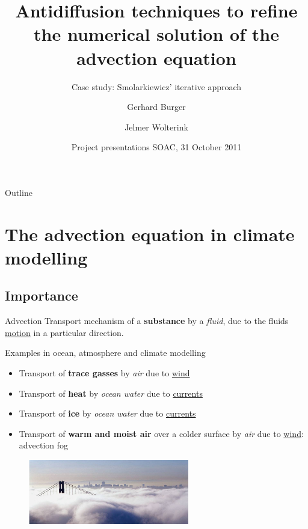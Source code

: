 \documentclass[hyperref={pdfstartview=Fit}]{beamer}
\title[Advection equation and antidiffusion]%
{Antidiffusion techniques to refine the numerical solution of the advection equation}
\subtitle{Case study: Smolarkiewicz' iterative approach}
\author[Burger, Wolterink]%
{Gerhard Burger \and Jelmer Wolterink}
\institute[Utrecht University]%
{
  Scientific Computing\\
  Department of Mathematics\\
  Utrecht University
}
\date[31-Oct-2011] %
{Project presentations SOAC, 31 October 2011}
\begin{document}
\begin{frame}
  \titlepage
\end{frame}

\begin{frame}{Outline}
  \tableofcontents
\end{frame}

\section{The advection equation in climate modelling}
\subsection{Importance}

\begin{frame}

\begin{block}{Advection}
Transport mechanism of a \textbf{substance} by a \textit{fluid}, due to the fluids \underline{motion} in a particular direction.
\end{block}

Examples in ocean, atmosphere and climate modelling

\begin{itemize}
   \item Transport of \textbf{trace gasses} by \textit{air} due to \underline{wind}
   \item Transport of \textbf{heat} by \textit{ocean water} due to \underline{currents}
   \item Transport of \textbf{ice} by \textit{ocean water} due to \underline{currents}
   \item Transport of \textbf{warm and moist air} over a colder surface by \textit{air} due to \underline{wind}: advection fog
\end{itemize}

\begin{figure}
\includegraphics[width=7cm]{advfog.png}
\end{figure}

\end{frame}
\end{document}
